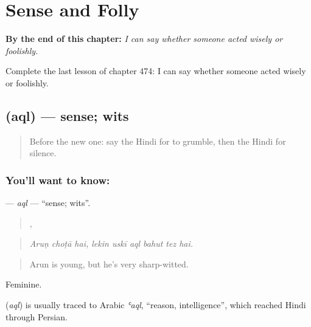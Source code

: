 
\chapter{Sense and Folly}
\label{ch:hi-sense-and-folly}

\begin{chapteropening}
\textbf{By the end of this chapter:} \emph{I can say whether someone acted wisely or foolishly.}

Complete the last lesson of chapter 474: I can say whether someone acted wisely or foolishly.
\end{chapteropening}

\section[\texorpdfstring{\hi{अक़्ल} (aql)}{अक़्ल (aql)}]{ (aql) — sense; wits}

\label{lesson:HI-C474-aql}



\begin{quote}
Before the new one: say the Hindi for to grumble, then the Hindi for silence.
\end{quote}

\subsection*{You'll want to know: }
\textbf{} — \emph{aql} — \textquotedblleft{}sense; wits\textquotedblright{}.

\begin{quote}
  ,      
\end{quote}

\begin{quote}
\emph{Aruṇ choṭā hai, lekin uskī aql bahut tez hai.}
\end{quote}

\begin{quote}
Arun is young, but he's very sharp-witted.
\end{quote}

Feminine.

\begin{cousinweb}
\textbf{} (\emph{aql}) is usually traced to Arabic \emph{ʿaql}, \textquotedblleft{}reason, intelligence\textquotedblright{}, which reached Hindi through Persian.
\end{cousinweb}

